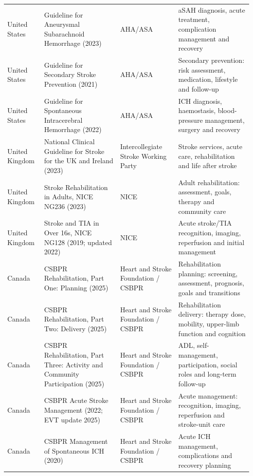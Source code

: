 \begin{landscape}
\begin{longtable}{@{}
>{\RaggedRight\arraybackslash}p{2.10cm}
>{\RaggedRight\arraybackslash}p{8.70cm}
>{\RaggedRight\arraybackslash}p{4.20cm}
>{\RaggedRight\arraybackslash}p{8.70cm}
@{}}
United States & Guideline for Aneurysmal Subarachnoid Hemorrhage (2023) \cite{S1Hoh2023AHAASAASAH} & AHA/ASA & aSAH diagnosis, acute treatment, complication management and recovery \\
United States & Guideline for Secondary Stroke Prevention (2021) \cite{S1Kleindorfer2021AHAASASecondaryPrevention} & AHA/ASA & Secondary prevention: risk assessment, medication, lifestyle and follow-up \\
United States & Guideline for Spontaneous Intracerebral Hemorrhage (2022) \cite{S1Greenberg2022AHAASAICH} & AHA/ASA & ICH diagnosis, haemostasis, blood-pressure management, surgery and recovery \\
United Kingdom & National Clinical Guideline for Stroke for the UK and Ireland (2023) \cite{S1Intercollegiate2023NationalStroke} & Intercollegiate Stroke Working Party & Stroke services, acute care, rehabilitation and life after stroke \\
United Kingdom & Stroke Rehabilitation in Adults, NICE NG236 (2023) \cite{S1NICE2023NG236} & NICE & Adult rehabilitation: assessment, goals, therapy and community care \\
United Kingdom & Stroke and TIA in Over 16s, NICE NG128 (2019; updated 2022) \cite{S1NICE2019NG128} & NICE & Acute stroke/TIA recognition, imaging, reperfusion and initial management \\
Canada & CSBPR Rehabilitation, Part One: Planning (2025) \cite{S1CSBPR2025RehabPart1} & Heart and Stroke Foundation / CSBPR & Rehabilitation planning: screening, assessment, prognosis, goals and transitions \\
Canada & CSBPR Rehabilitation, Part Two: Delivery (2025) \cite{S1CSBPR2025RehabPart2} & Heart and Stroke Foundation / CSBPR & Rehabilitation delivery: therapy dose, mobility, upper-limb function and cognition \\
Canada & CSBPR Rehabilitation, Part Three: Activity and Community Participation (2025) \cite{S1CSBPR2025RehabPart3} & Heart and Stroke Foundation / CSBPR & ADL, self-management, participation, social roles and long-term follow-up \\
Canada & CSBPR Acute Stroke Management (2022; EVT update 2025) \cite{S1CSBPR20222025Acute} & Heart and Stroke Foundation / CSBPR & Acute management: recognition, imaging, reperfusion and stroke-unit care \\
Canada & CSBPR Management of Spontaneous ICH (2020) \cite{S1CSBPR2020ICH} & Heart and Stroke Foundation / CSBPR & Acute ICH management, complications and recovery planning \\

\end{longtable}
\end{landscape}
